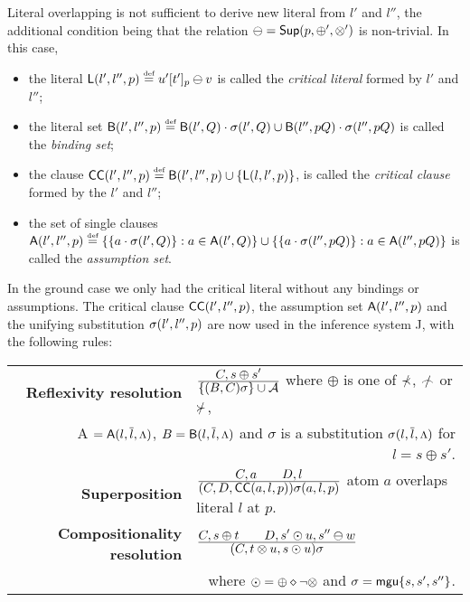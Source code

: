 Literal overlapping is not sufficient to derive new literal from $l'$ and
$l''$, the additional condition being that the relation \(\ominus
=\mbox {\sf Sup}(p ,\oplus' ,\otimes')\) is non-trivial.  In this case,
\begin{itemize}%
\item the literal \({\sf L} (l',l'',p)\mathrel {\stackrel {\mbox {\tiny def}}{=}} u'[t']_p\ominus v\) is called the {\em
    critical literal} formed by  \(l'\) and \(l''\); 
\item the literal set \({\sf B}(l',l'',p)\mathrel {\stackrel {\mbox {\tiny def}}{=}} {\sf B}(l',Q) \cdot \sigma(l',Q )\cup
   {\sf B}(l'',pQ) \cdot \sigma(l'',pQ)\) is called the {\em binding set};
\item the clause \({\sf CC}(l',l'',p)\mathrel {\stackrel {\mbox {\tiny def}}{=}} {\sf B}(l',l'',p) \cup \{{\sf L} (l,l',p)\}\), 
   is called the {\em critical clause} formed by the  \(l'\) and \(l''\);
\item the set of single clauses \({\sf A}(l',l'',p)\mathrel {\stackrel {\mbox {\tiny def}}{=}} \{\{a \cdot \sigma(l',Q)\}:
   a\in{\sf A}(l',Q)\} \cup \{\{a \cdot \sigma(l'',pQ)\}: a\in{\sf A}(l'',pQ)\}\) is
   called the {\em assumption set}.
\end{itemize}
%
In the ground case 
we only had the critical literal without any bindings or
assumptions.  The critical clause \({\sf CC}(l',l'',p)\), the assumption set
\({\sf A}(l',l'',p)\) and the unifying substitution \(\sigma(l',l'',p)\) are
now used in the  inference system \C J, with the following rules: \\[2ex]
%
\begin{tabular}{r@{\ :\ }l}
{\bf Reflexivity resolution} & \quad\({\displaystyle C,s\oplus s' \over \displaystyle\{(B,C)\sigma\}\cup \mbox {$\cal A$}}\) 
\quad
where \(\oplus\) is one of \(\notIncl\), \(\notInt\) or \(\notCont\),\\[2ex]
\multicolumn{2}{r}{\C A \(={\sf A}(l,\overline{l},\mbox{\footnotesize$\Lambda$})\),
\(B={\sf B}(l,\overline{l},\mbox{\footnotesize$\Lambda$})\) and
$\sigma$ is a substitution \(\sigma(l,\overline{l},\mbox{\footnotesize$\Lambda$})\) for \(l= s\oplus s'\).} \\[3ex]
%
{\bf Superposition} & \quad \({\displaystyle C,a \qquad D,l \over \displaystyle(C,D,{\sf CC}(a,l,p))\sigma(a,l,p)}\) \quad 
atom \(a\) overlaps literal \(l\) at $p$.\\[3ex]
%
{\bf Compositionality resolution} & 
\quad \({\displaystyle C,s\oplus t \qquad D,s'\odot u,s''\ominus w \over \displaystyle(C,t\otimes u,s\odot u)\sigma}\) \quad  \\[2ex] 
\multicolumn{2}{r}{where
\(\odot = \oplus\diamond\neg\otimes\) and \(\sigma={\sf mgu}\{s,s',s''\}\).}
\end{tabular}

